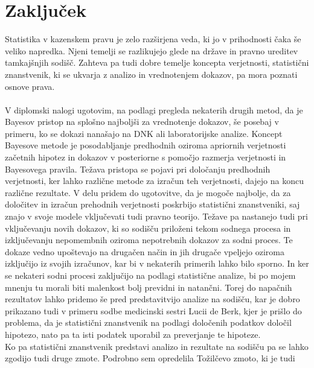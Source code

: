 \documentclass[fin1, tisk]{fmfdelo}
\theoremstyle{definition}
\theoremstyle{trditev}
\theoremstyle{izrek}
\begin{document}
\section{Zaključek}
Statistika v kazenskem pravu je zelo razširjena veda, ki jo v prihodnosti čaka še veliko napredka. Njeni temelji se razlikujejo glede na države in pravno ureditev
tamkajšnjih sodišč. Zahteva pa tudi dobre temelje koncepta verjetnosti, statistični znanstvenik, ki se ukvarja z analizo in vrednotenjem dokazov, pa mora poznati
osnove prava.\\\\
V diplomski nalogi ugotovim, na podlagi pregleda nekaterih drugih metod, da je Bayesov pristop na splošno najboljši za vrednotenje dokazov, še posebaj v primeru,
ko se dokazi nanašajo na DNK ali laboratorijske analize. Koncept Bayesove metode je posodabljanje predhodnih oziroma apriornih verjetnosti začetnih hipotez in dokazov v
posteriorne s pomočjo razmerja  verjetnosti in Bayesovega pravila. Težava pristopa se pojavi pri določanju predhodnih verjetnosti, ker lahko različne metode za izračun
teh verjetnosti, dajejo na koncu različne rezultate. V delu pridem do ugotovitve, da je mogoče najbolje, da za določitev in izračun prehodnih verjetnosti poskrbijo
statistični znanstveniki, saj znajo v svoje modele vključevati tudi pravno teorijo. Težave pa nastanejo tudi pri vključevanju novih dokazov, ki so sodišču priloženi
tekom sodnega procesa in izključevanju nepomembnih oziroma nepotrebnih dokazov za sodni proces. Te dokaze vedno upoštevajo na drugačen način in jih drugače
vpeljejo oziroma izključijo iz svojih izračunov, kar bi v nekaterih primerih lahko bilo sporno. In ker se nekateri sodni procesi zaključijo na podlagi statistične
analize, bi po mojem mnenju tu morali biti malenkost bolj previdni in natančni. Torej do napačnih rezultatov lahko pridemo še pred predstavitvijo analize na sodišču, kar
je dobro prikazano tudi v primeru sodbe medicinski sestri Lucii de Berk, kjer je prišlo do problema, da je statistični znanstvenik na podlagi določenih podatkov
določil hipotezo, nato pa ta isti podatek uporabil za preverjanje te hipoteze. \\
Ko pa statistični znanstvenik predstavi analizo in rezultate na sodišču pa se lahko zgodijo tudi druge zmote. Podrobno sem opredelila Tožilčevo zmoto, ki je tudi
\end{document}

